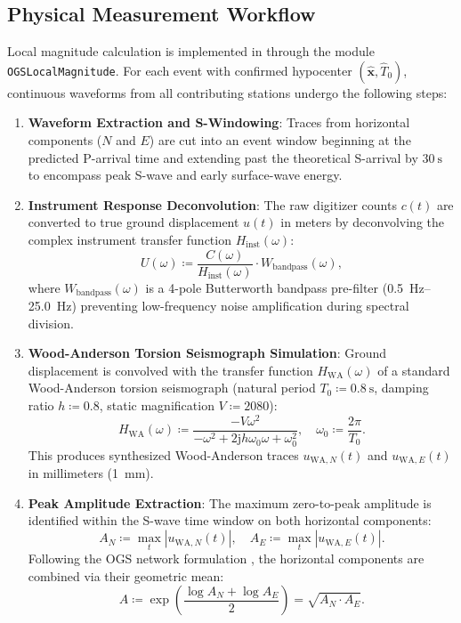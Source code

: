 \subsection{Physical Measurement Workflow}
Local magnitude calculation is implemented in
 through the module
\texttt{OGSLocalMagnitude}. For each event with confirmed hypocenter
$(\hat{\mathbf{x}}, \hat{T}_0)$, continuous waveforms from all
contributing stations undergo the following steps:
\begin{enumerate}
  \item \textbf{Waveform Extraction and S-Windowing}: Traces from
    horizontal components ($N$ and $E$) are cut into an event window
    beginning at the predicted P-arrival time and extending past the
    theoretical S-arrival by $\qty{30}{\second}$ to encompass peak
    S-wave and early surface-wave energy.
  \item \textbf{Instrument Response Deconvolution}: The raw
    digitizer counts $c(t)$ are converted to true ground
    displacement $u(t)$ in meters by deconvolving the complex
    instrument transfer function $H_{\mathrm{inst}}(\omega)$:
    \begin{equation}
      U(\omega) \coloneqq \frac{C(\omega)}{H_{\mathrm{inst}}(\omega)} \cdot
      W_{\mathrm{bandpass}}(\omega),
    \end{equation}
    where $W_{\mathrm{bandpass}}(\omega)$ is a 4-pole Butterworth
    bandpass pre-filter (\qtyrange{0.5}{25.0}{\hertz}) preventing
    low-frequency noise amplification during spectral division.
  \item \textbf{Wood-Anderson Torsion Seismograph Simulation}:
    Ground displacement is convolved with the transfer function
    $H_{\mathrm{WA}}(\omega)$ of a standard Wood-Anderson torsion
    seismograph (natural period $T_0 \coloneqq \qty{0.8}{\second}$, damping
      ratio $h \coloneqq \num{0.8}$, static magnification $V \coloneqq
    \num{2080}$):
    \begin{equation}
      H_{\mathrm{WA}}(\omega) \coloneqq \frac{-V \omega^2}{-\omega^2
        + 2 \mathrm{j} h
      \omega_0 \omega + \omega_0^2}, \quad \omega_0 \coloneqq \frac{2\pi}{T_0}.
      \label{eq:wood_anderson}
    \end{equation}
    This produces synthesized Wood-Anderson traces $u_{\mathrm{WA},
    N}(t)$ and $u_{\mathrm{WA}, E}(t)$ in millimeters (\qty{1}{\milli\meter}).
  \item \textbf{Peak Amplitude Extraction}: The maximum zero-to-peak
    amplitude is identified within the S-wave time window on both
    horizontal components:
    \begin{equation}
      A_N \coloneqq \max_{t} |u_{\mathrm{WA}, N}(t)|, \quad A_E
      \coloneqq \max_{t}
      |u_{\mathrm{WA}, E}(t)|.
    \end{equation}
    Following the \ac{OGS} network formulation \parencite{SMINO}, the
    horizontal components are combined via their geometric mean:
    \begin{equation}
      A \coloneqq \exp\left( \frac{\log A_N + \log A_E}{2} \right) =
      \sqrt{A_N \cdot A_E}.
    \end{equation}
\end{enumerate}

